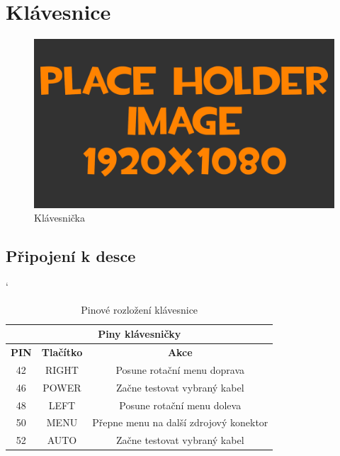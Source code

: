 
\section{Klávesnice}
\begin{figure}[h!]
	\centering
	\includegraphics[width=\textwidth]{pictures/placeHolderFHD.png}
    	\caption{Klávesnička}
   	\label{fig:keyborad}
\end{figure}

\subsection{Připojení k desce}
\begin{table} [h!]
	\centering
	\catcode` %
	\begin{tabular}[c]{|| c | c | c ||}
	\hline
		\multicolumn{3}{||c||}{Piny klávesničky} \\
	\hline
 		 \textbf{PIN} & \textbf{Tlačítko} & \textbf{Akce}\\
	\hline
		42 &  RIGHT & Posune rotační menu doprava\\
	\hline
		46 & POWER &  Začne testovat vybraný kabel\\
	\hline
		48 & LEFT & Posune rotační menu doleva\\
	\hline
		50 & MENU & Přepne menu na další zdrojový konektor \\
	\hline
		52 & AUTO & Začne testovat vybraný kabel\\
	\hline
	\end{tabular}
	\caption{Pinové rozložení klávesnice}
	\label{table:pinKB}
\end{table}
